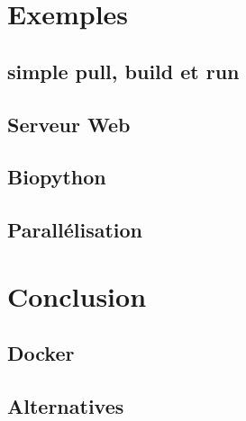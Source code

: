 \section{Exemples}
\subsection{simple pull, build et run}
\subsection{Serveur Web}
\subsection{Biopython}
\subsection{Parallélisation}

\section{Conclusion}
\subsection{Docker}
\subsection{Alternatives}
